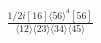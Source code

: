 \documentclass[varwidth, border=5pt]{standalone}
\begin{document}
\begin{my}
$\begin{gathered}
\scriptscriptstyle\frac{1/2i[16]\langle56\rangle^4[56]}{\langle12\rangle\langle23\rangle\langle34\rangle\langle45\rangle}
\end{gathered}$
\end{my}
\end{document}
